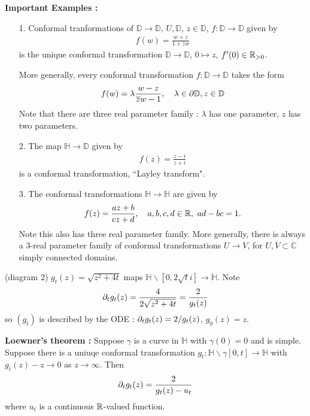 \documentclass[12pt,a4paper]{article}
\begin{document}
\textbf{Important Examples :}
\begin{itemize}
\item[1.] Conformal tranformations of $\mathbb{D} \rightarrow \mathbb{D}$, $U, \mathbb{D}$, $z\in \mathbb{D}$, $f:\mathbb{D}\rightarrow \mathbb{D}$ given by
\begin{align*}
f(w) = \frac{w+z}{1+ \bar{z}w}
\end{align*}
is the unique conformal transformation $\mathbb{D} \rightarrow \mathbb{D}$, $0\mapsto z$, $f'(0)\in \mathbb{R}_{>0}$.
\s

More generally, every conformal transformation $f: \mathbb{D}\rightarrow \mathbb{D}$ takes the form
\begin{align*}
f(w) = \lambda \frac{w-z}{\overline{z}w-1}, \quad \lambda \in \partial \mathbb{D}, z\in \mathbb{D}
\end{align*}
Note that there are three real parameter family : $\lambda$ has one parameter, $z$ has two parameters. 
\item[2.] The map $\mathbb{H} \rightarrow \mathbb{D}$ given by
\begin{align*}
f(z) = \frac{z-i}{z+i}
\end{align*}
is a conformal transformation, ``Layley transform".
\item[3.] The conformal transformations $\mathbb{H} \rightarrow \mathbb{H}$ are given by
\begin{align*}
f(z) = \frac{az+b}{cz+d}, \quad a,b,c,d\in \mathbb{R},\,\, ad-bc=1.
\end{align*}
Note this also has three real parameter family. More generally, there is always a 3-real parameter family of conformal transformations $U\rightarrow V$, for $U, V\subset \mathbb{C}$ simply connected domains.
\end{itemize}

(diagram 2)
$g_t(z)= \sqrt{z^2 + 4t}$ maps $\mathbb{H}\backslash[0, 2\sqrt{t}i] \rightarrow \mathbb{H}$. Note
\begin{align*}
\partial_t g_t(z) = \frac{4}{2\sqrt{z^2 + 4t}} = \frac{2}{g_t(z)}
\end{align*}
so $(g_t)$ is described by the ODE : $\partial_t g_t(z) = 2/g_t(z)$, $g_0(z)=z$.
\s

\textbf{Loewner's theorem :} Suppose $\gamma$ is a curve in $\mathbb{H}$ with $\gamma(0)=0$ and is simple. Suppose there is a uniuqe conformal transformation $g_t : \mathbb{H} \backslash \gamma[0,t] \rightarrow \mathbb{H}$ with $g_t(z)- z\rightarrow 0$ as $z\rightarrow \infty$. Then
\begin{align*}
\partial_t g_t(z) = \frac{2}{g_t(z) - u_t}
\end{align*}
where $u_t$ is a continuous $\mathbb{R}$-valued function.
\s
\end{document}
